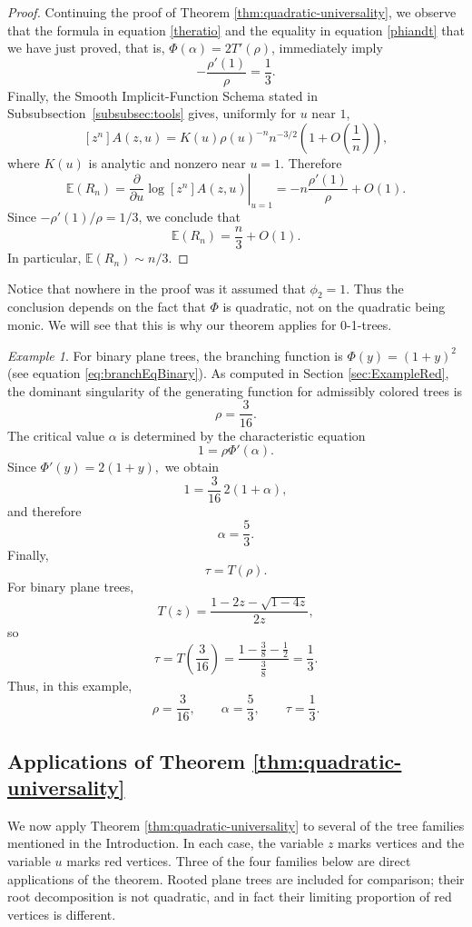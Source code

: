 \documentclass[10pt,a4paper]{amsart}
\theoremstyle{remark}
\newtheorem{example}[theorem]{Example}
\begin{document}
\begin{proof}
Continuing the proof of Theorem \ref{thm:quadratic-universality}, we observe that
the formula in equation \eqref{theratio} and the equality in equation \eqref{phiandt} that we have just proved, that is, $\Phi(\alpha)=2T'(\rho)$, immediately imply
\[
-\frac{\rho'(1)}{\rho}
=
\frac{1}{3}.
\]
Finally, the Smooth Implicit-Function Schema stated in Subsubsection~\ref{subsubsec:tools} gives, uniformly for
\(u\) near \(1\),
\[
[z^n]A(z,u)
=
K(u)\rho(u)^{-n}n^{-3/2}
\left(1+O\left(\frac{1}{n}\right)\right),
\]
where \(K(u)\) is analytic and nonzero near \(u=1\). Therefore
\[
\mathbb{E}(R_n)
=
\left.
\frac{\partial}{\partial u}
\log [z^n]A(z,u)
\right|_{u=1}
=
-n\frac{\rho'(1)}{\rho}+O(1).
\]
Since $-\rho'(1)/\rho=1/3$,
we conclude that
\[
\mathbb{E}(R_n)
=
\frac{n}{3}+O(1).
\]
In particular, $\mathbb{E}(R_n)\sim n/3$.
\end{proof}

Notice that nowhere in the proof was it assumed that
\(\phi_2=1\). Thus the conclusion depends on the fact that
\(\Phi\) is quadratic, not on the quadratic being monic.  We will see that this is why our theorem applies
for 0-1-trees. 



\begin{example}
For binary plane trees, the branching function is
$
\Phi(y)=(1+y)^2
$ 
(see equation \eqref{eq:branchEqBinary}).
As computed in Section \ref{sec:ExampleRed}, the dominant singularity of the generating function for admissibly colored trees is
\[
\rho=\frac{3}{16}.
\]
The critical value \(\alpha\) is determined by the characteristic equation
\[
1=\rho\Phi'(\alpha).
\]
Since
$
\Phi'(y)=2(1+y),
$
we obtain
\[
1=\frac{3}{16}\,2(1+\alpha),
\]
and therefore
\[
\alpha=\frac{5}{3}.
\]
Finally,
\[
\tau=T(\rho).
\]
For binary plane trees,
\[
T(z)=\frac{1-2z-\sqrt{1-4z}}{2z},
\]
so
\[
\tau=T\left(\frac{3}{16}\right)
=\frac{1-\frac{3}{8}-\frac12}{\frac{3}{8}}
=\frac13.
\]
Thus, in this example,
\[
{\rho=\frac{3}{16},\qquad \alpha=\frac53,\qquad \tau=\frac13.}
\]
\end{example}

\subsection{Applications of Theorem \ref{thm:quadratic-universality}}
\label{subsec:appIdeal}

We now apply Theorem \ref{thm:quadratic-universality} to several of the tree families mentioned in the Introduction. In each case, the variable $z$ marks vertices and the variable $u$ marks red vertices. Three of the four families below are direct applications of the theorem. Rooted plane trees are included for comparison; their root decomposition is not quadratic, and in fact their limiting proportion of red vertices is different.
\end{document}
